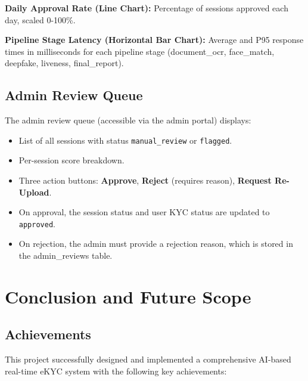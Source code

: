 \textbf{Daily Approval Rate (Line Chart):} Percentage of sessions approved each day, scaled 0-100\%.

\textbf{Pipeline Stage Latency (Horizontal Bar Chart):} Average and P95 response times in milliseconds for each pipeline stage (document\_ocr, face\_match, deepfake, liveness, final\_report).

\section{Admin Review Queue}

The admin review queue (accessible via the admin portal) displays:
\begin{itemize}
    \item List of all sessions with status \texttt{manual\_review} or \texttt{flagged}.
    \item Per-session score breakdown.
    \item Three action buttons: \textbf{Approve}, \textbf{Reject} (requires reason), \textbf{Request Re-Upload}.
    \item On approval, the session status and user KYC status are updated to \texttt{approved}.
    \item On rejection, the admin must provide a rejection reason, which is stored in the admin\_reviews table.
\end{itemize}

\chapter{Conclusion and Future Scope}

\section{Achievements}

This project successfully designed and implemented a comprehensive AI-based real-time eKYC system with the following key achievements:

